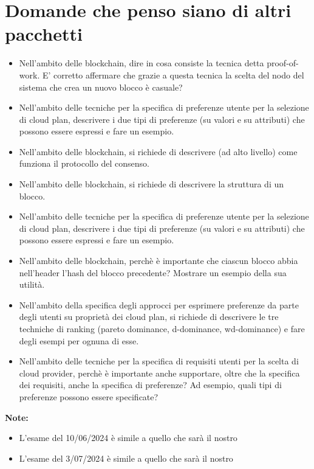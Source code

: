 \documentclass{report}
\begin{document}
\chapter{Domande che penso siano di altri pacchetti}
\begin{itemize}
    \item Nell'ambito delle blockchain, dire in cosa consiste la tecnica detta proof-of-work. E' corretto affermare che
grazie a questa tecnica la scelta del nodo del sistema che crea un nuovo blocco è casuale?
    \item Nell'ambito delle tecniche per la specifica di preferenze utente per la selezione di cloud plan, descrivere i due
tipi di preferenze (su valori e su attributi) che possono essere espressi e fare un esempio.
    \item Nell'ambito delle blockchain, si richiede di descrivere (ad alto livello) come funziona il protocollo del consenso.
    \item Nell'ambito delle blockchain, si richiede di descrivere la struttura di un blocco.
    \item Nell'ambito delle tecniche per la specifica di preferenze utente per la selezione di cloud plan, descrivere i due
tipi di preferenze (su valori e su attributi) che possono essere espressi e fare un esempio.
    \item Nell'ambito delle blockchain, perchè è importante che ciascun blocco abbia nell'header l'hash del blocco
precedente? Mostrare un esempio della sua utilità.
    \item Nell'ambito della specifica degli approcci per esprimere preferenze da parte degli utenti su proprietà dei cloud
plan, si richiede di descrivere le tre techniche di ranking (pareto dominance, d-dominance, wd-dominance) e
fare degli esempi per ognuna di esse.
    \item Nell'ambito delle tecniche per la specifica di requisiti utenti per la scelta di cloud provider, perchè è importante
anche supportare, oltre che la specifica dei requisiti, anche la specifica di preferenze? Ad esempio, quali tipi di
preferenze possono essere specificate?
\end{itemize}


\noindent \textbf{Note:}
\begin{itemize}
    \item L'esame del 10/06/2024 è simile a quello che sarà il nostro
    \item L'esame del 3/07/2024 è simile a quello che sarà il nostro
\end{itemize}
\end{document}
